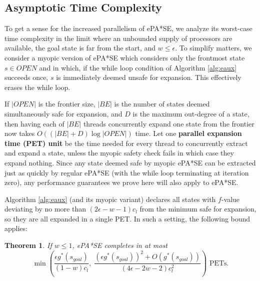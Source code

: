 \documentclass[letterpaper]{article}
\newtheorem{thm}{Theorem}
\begin{document}
\subsection{Asymptotic Time Complexity}

To get a sense for the increased parallelism of ePA*SE, we analyze its worst-case time complexity in the limit where an unbounded supply of processors are available, the goal state is far from the start, and $w \le \epsilon$. To simplify matters, we consider a myopic version of ePA*SE which considers only the frontmost state $s\in OPEN$ and in which, if the while loop condition of Algorithm \ref{alg:eaux} succeeds once, $s$ is immediately deemed unsafe for expansion. This effectively erases the while loop. 

If $|OPEN|$ is the frontier size, $|BE|$ is the number of states deemed simultaneously safe for expansion, and $D$ is the maximum out-degree of a state, then having each of $|BE|$ threads concurrently expand one state from the frontier now takes $O\left((|BE|+D)\log|OPEN|\right)$ time. Let one \textbf{parallel expansion time (PET) unit} be the time needed for every thread to concurrently extract and expand a state, unless the myopic safety check fails in which case they expand nothing. Since any state deemed safe by myopic ePA*SE can be extracted just as quickly by regular ePA*SE (with the while loop terminating at iteration zero), any performance guarantees we prove here will also apply to ePA*SE.

Algorithm \ref{alg:eaux} (and its myopic variant) declares all states with $f$-value deviating by no more than $(2\epsilon-w-1)c_l$ from the minimum safe for expansion, so they are all expanded in a single PET. In such a setting, the following bound applies:

\begin{thm}
\label{thm:depth}
If $w \le 1$, ePA*SE completes in at most
\[\min\left(\frac{\epsilon g^*(s_{goal})}{(1-w)c_l},\;
\frac{\left(\epsilon g^*(s_{goal})\right)^2 + O(g^*(s_{goal})) }{(4\epsilon-2w-2)c_l^2} \right)\text{ PETs.}\]
\end{thm}
\end{document}
